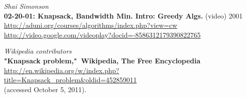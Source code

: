 \documentclass[11pt]{article}
\begin{document}
\vspace{1cm}
\begin{thebibliography}{0}

{\em Shai Simonson} \\
{\bf 02-20-01: Knapsack, Bandwidth Min. Intro: Greedy Algs.} (video) 2001 \\
\url{http://aduni.org/courses/algorithms/index.php?view=cw} \\
\url{http://video.google.com/videoplay?docid=-8586312179390822765}

{\em Wikipedia contributors} \\
{\bf "Knapsack problem,"\ Wikipedia, The Free Encyclopedia} \\
\url{http://en.wikipedia.org/w/index.php?title=Knapsack_problem&oldid=452859011} \\ 
(accessed October 5, 2011).

\end{thebibliography}
\end{document}
